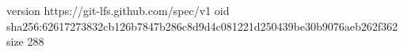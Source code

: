 version https://git-lfs.github.com/spec/v1
oid sha256:62617273832cb126b7847b286c8d9d4c081221d250439be30b9076aeb262f362
size 288
